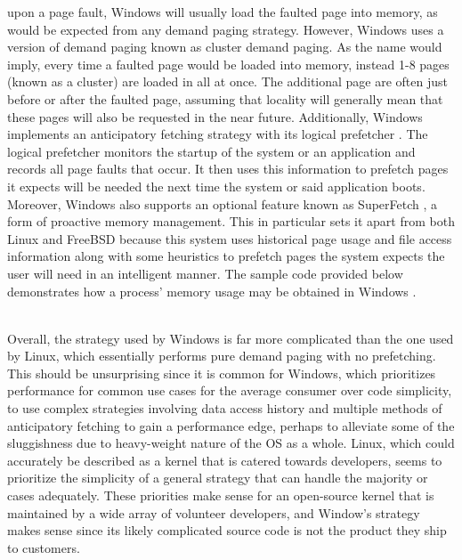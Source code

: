 \documentclass[onecolumn, draftclsnofoot,10pt, compsoc]{IEEEtran}
\begin{document}
upon a page fault, Windows will usually load the faulted page into memory, as would be expected from any demand paging strategy. However, Windows uses a version of demand paging known as cluster demand paging. As the name would imply, every time a faulted page would be loaded into memory, instead 1-8 pages (known as a cluster) are loaded in all at once. The additional page are often just before or after the faulted page, assuming that locality will generally mean that these pages will also be requested in the near future. Additionally, Windows implements an anticipatory fetching strategy with its logical prefetcher \cite{WindowsInternals2}. The logical prefetcher monitors the startup of the system or an application and records all page faults that occur. It then uses this information to prefetch pages it expects will be needed the next time the system or said application boots. Moreover, Windows also supports an optional feature known as SuperFetch \cite{WindowsInternals2}, a form of proactive memory management. This in particular sets it apart from both Linux and FreeBSD because this system uses historical page usage and file access information along with some heuristics to prefetch pages the system expects the user will need in an intelligent manner. The sample code provided below demonstrates how a process' memory usage may be obtained in Windows \cite{CollectMemoryInfo}.\\ \\

\par Overall, the strategy used by Windows is far more complicated than the one used by Linux, which essentially performs pure demand paging with no prefetching. This should be unsurprising since it is common for Windows, which prioritizes performance for common use cases for the average consumer over code simplicity, to use complex strategies involving data access history and multiple methods of anticipatory fetching to gain a performance edge, perhaps to alleviate some of the sluggishness due to heavy-weight nature of the OS as a whole. Linux, which could accurately be described as a kernel that is catered towards developers, seems to prioritize the simplicity of a general strategy that can handle the majority or cases adequately. These priorities make sense for an open-source kernel that is maintained by a wide array of volunteer developers, and Window's strategy makes sense since its likely complicated source code is not the product they ship to customers.
\end{document}
